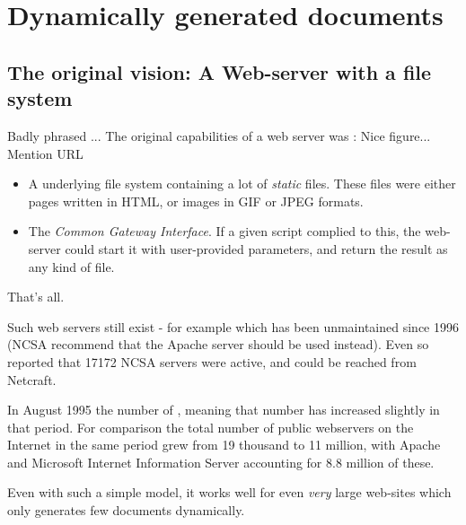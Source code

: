 

\chapter{Dynamically generated documents}
\label{cha:dynamically-generated-documents}


\section{The original vision: A Web-server with a file system }

\textsf{Badly phrased ...} 
The original capabilities of a web server was : \textsf{Nice
  figure... Mention URL}

\begin{itemize}
\item A underlying file system containing a lot of \textit{static}
files.  These files were either pages written in HTML, or images in
GIF or JPEG formats.

\item The \textit{Common Gateway Interface}.  If a given script
complied to this, the web-server could start it with user-provided
parameters, and return the result as any kind of file.
\end{itemize}

That's all.  

Such web servers still exist - for example
 which has been
unmaintained since 1996 (NCSA recommend that the Apache server should
be used instead).  Even so
 reported that \textsf{17172} NCSA servers were
active, and could be reached from Netcraft.

In August 1995 the number of
, meaning that number has increased slightly
in that period.  For comparison the total number of public webservers
on the Internet in the same period grew from 19 thousand to 11
million, with Apache and Microsoft Internet Information Server
accounting for 8.8 million of these.

Even with such a simple model, it works well for even \textit{very}
large web-sites which only generates few documents dynamically.

